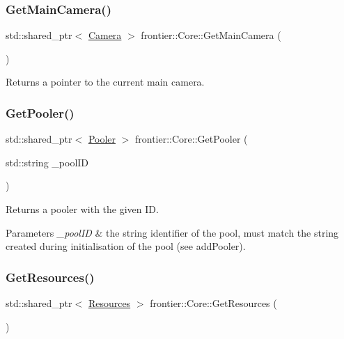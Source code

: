 \subsubsection{\texorpdfstring{Get\+Main\+Camera()}{GetMainCamera()}}
{\footnotesize\ttfamily std\+::shared\+\_\+ptr$<$ \hyperlink{classfrontier_1_1_camera}{Camera} $>$ frontier\+::\+Core\+::\+Get\+Main\+Camera (\begin{DoxyParamCaption}{ }\end{DoxyParamCaption})}



Returns a pointer to the current main camera. 

\mbox{\label{classfrontier_1_1_core_a1ebe697a4700dfc8f3ba4749aa9bd854}} 
\subsubsection{\texorpdfstring{Get\+Pooler()}{GetPooler()}}
{\footnotesize\ttfamily std\+::shared\+\_\+ptr$<$ \hyperlink{classfrontier_1_1_pooler}{Pooler} $>$ frontier\+::\+Core\+::\+Get\+Pooler (\begin{DoxyParamCaption}\item[{std\+::string}]{\+\_\+pool\+ID }\end{DoxyParamCaption})}



Returns a pooler with the given ID. 


\begin{DoxyParams}{Parameters}
{\em \+\_\+pool\+ID} & the string identifier of the pool, must match the string created during initialisation of the pool (see add\+Pooler). \\
\hline
\end{DoxyParams}
\mbox{\label{classfrontier_1_1_core_af05275451ce494dd3df46ed97b6f643a}} 
\subsubsection{\texorpdfstring{Get\+Resources()}{GetResources()}}
{\footnotesize\ttfamily std\+::shared\+\_\+ptr$<$ \hyperlink{classfrontier_1_1_resources}{Resources} $>$ frontier\+::\+Core\+::\+Get\+Resources (\begin{DoxyParamCaption}{ }\end{DoxyParamCaption})}



